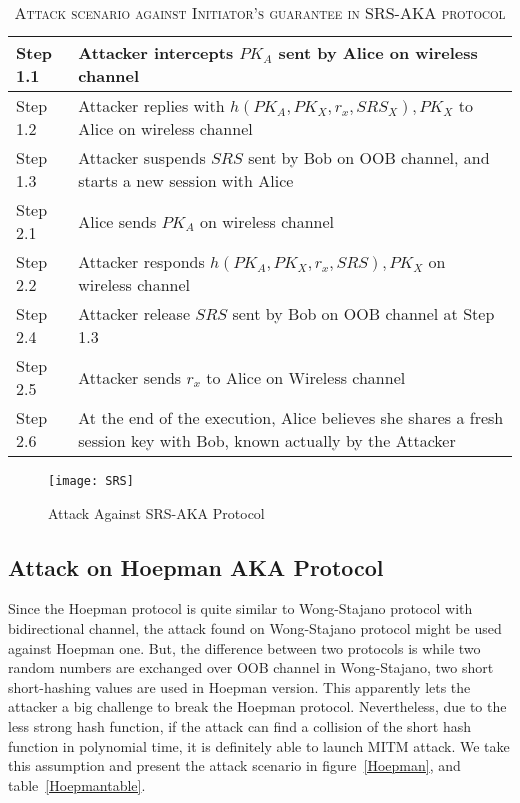 \begin{table}[t]
\centering
\caption{\textsc{Attack scenario against Initiator's guarantee in SRS-AKA protocol}}
\label{SRSattacktable}
{\small
\begin{tabular}{| l | p{11cm} |}
 \hline
 Step 1.1 & Attacker intercepts $PK_A$ sent by Alice on wireless channel\\ \hline
 Step 1.2 & Attacker replies with $h(PK_A,PK_X,r_x,SRS_X), PK_X$ to Alice on wireless channel\\ \hline
 Step 1.3 & Attacker suspends $SRS$ sent by Bob on OOB channel, and starts a new session with Alice\\ \hline \hline
 Step 2.1 & Alice sends $PK_A$ on wireless channel\\ \hline
 Step 2.2 & Attacker responds $h(PK_A,PK_X,r_x,SRS), PK_X$  on wireless channel\\ \hline
 Step 2.4 & Attacker release $SRS$ sent by Bob on OOB channel at Step 1.3\\ \hline
 Step 2.5 & Attacker sends $r_x$ to Alice on Wireless channel\\ \hline
 Step 2.6 & At the end of the execution, Alice believes she shares a fresh session key with Bob, known actually by the Attacker\\ \hline
\end{tabular}
}
\end{table}

\begin{figure}
  \centering
  \texttt{[image: SRS]}
  \caption{Attack Against SRS-AKA Protocol}
  \label{SRSattack}
\end{figure}


\subsection{Attack on Hoepman AKA Protocol}

Since the Hoepman protocol is quite similar to Wong-Stajano protocol with bidirectional channel, the attack found on Wong-Stajano protocol might be used against Hoepman one. But, the difference between two protocols is while two random numbers are exchanged over OOB channel in Wong-Stajano, two short short-hashing values are used in Hoepman version. This apparently lets the attacker a big challenge to break the Hoepman protocol. Nevertheless, due to the less strong hash function, if the attack can find a collision of the short hash function in polynomial time, it is definitely able to launch MITM attack. We take this assumption and present the attack scenario in figure~\ref{Hoepman}, and table~\ref{Hoepmantable}. 
   
